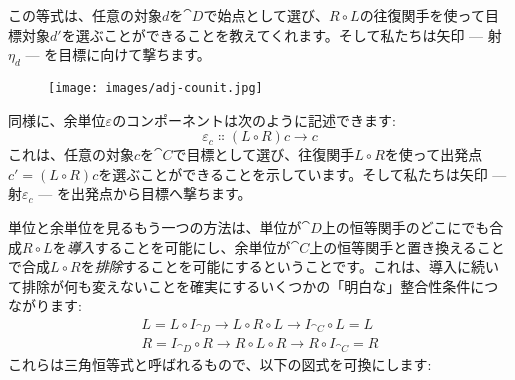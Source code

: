 この等式は、任意の対象$d$を$\cat{D}$で始点として選び、$R \circ L$の往復関手を使って目標対象$d'$を選ぶことができることを教えてくれます。そして私たちは矢印 --- 射$\eta_d$ --- を目標に向けて撃ちます。

\begin{figure}[H]
  \centering
  \texttt{[image: images/adj-counit.jpg]}
\end{figure}

\noindent
同様に、余単位$\varepsilon$のコンポーネントは次のように記述できます: 
\[\varepsilon_{c} \Colon (L \circ R) c \to c\]
これは、任意の対象$c$を$\cat{C}$で目標として選び、往復関手$L \circ R$を使って出発点$c' = (L \circ R) c$を選ぶことができることを示しています。そして私たちは矢印 --- 射$\varepsilon_{c}$ --- を出発点から目標へ撃ちます。

単位と余単位を見るもう一つの方法は、単位が$\cat{D}$上の恒等関手のどこにでも合成$R \circ L$を\emph{導入}することを可能にし、余単位が$\cat{C}$上の恒等関手と置き換えることで合成$L \circ R$を\emph{排除}することを可能にするということです。これは、導入に続いて排除が何も変えないことを確実にするいくつかの「明白な」整合性条件につながります: 
\begin{gather*}
  L = L \circ I_{\cat{D}} \to L \circ R \circ L \to I_{\cat{C}} \circ L = L \\
  R = I_{\cat{D}} \circ R \to R \circ L \circ R \to R \circ I_{\cat{C}} = R
\end{gather*}
これらは三角恒等式と呼ばれるもので、以下の図式を可換にします: 

\begin{figure}[H]
  \centering

  \begin{subfigure}
    \centering
  \end{subfigure}%
  \hspace{1cm}
  \begin{subfigure}
    \centering
  \end{subfigure}
\end{figure}

